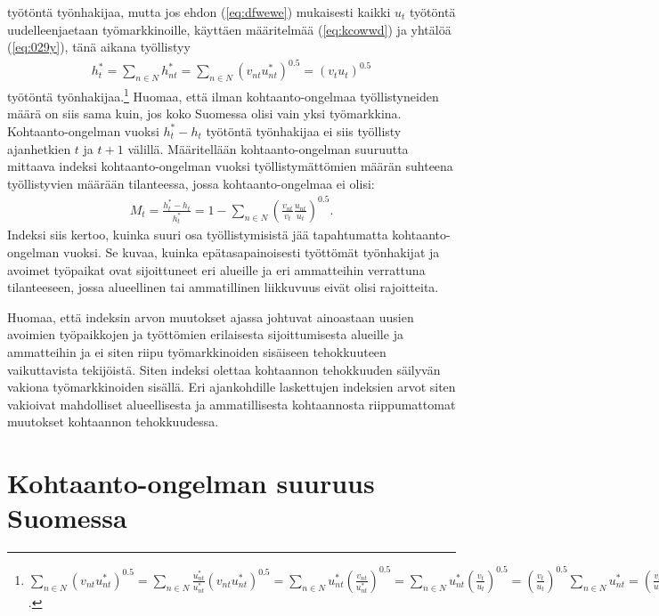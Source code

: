 \documentclass[12pt]{article}
\begin{document}
työtöntä työnhakijaa, mutta jos ehdon (\ref{eq:dfwewe}) mukaisesti kaikki $u_t$ työtöntä uudelleenjaetaan työmarkkinoille, käyttäen määritelmää (\ref{eq:kcowwd}) ja yhtälöä (\ref{eq:029y}), tänä aikana työllistyy
\begin{align}
h_t^*=\sum_{n\in N} h_{nt}^*=\sum_{n\in N}\left(v_{nt}u_{nt}^*\right)^{0.5}=\left(v_tu_t\right)^{0.5}
\end{align}
työtöntä työnhakijaa.\footnote{$\sum_{n\in N}\left(v_{nt}u_{nt}^*\right)^{0.5} = \sum_{n\in N} \frac{u_{nt}^*}{u_{nt}^*} \left(v_{nt}u_{nt}^*\right)^{0.5} = \sum_{n\in N} u_{nt}^* \left( \frac{v_{nt}}{u_{nt}^*}\right)^{0.5}= \sum_{n\in N} u_{nt}^* \left( \frac{v_t}{u_t}\right)^{0.5} = \left( \frac{v_t}{u_t}\right)^{0.5} \sum_{n\in N} u_{nt}^* = \left( \frac{v_t}{u_t}\right)^{0.5} u_t = (v_t u_t)^{0.5}$.} Huomaa, että ilman kohtaanto-ongelmaa työllistyneiden määrä on siis sama kuin, jos koko Suomessa olisi vain yksi työmarkkina. Kohtaanto-ongelman vuoksi $h_t^*-h_t$ työtöntä työnhakijaa ei siis työllisty ajanhetkien $t$ ja $t+1$ välillä. Määritellään kohtaanto-ongelman suuruutta mittaava indeksi kohtaanto-ongelman vuoksi työllistymättömien määrän suhteena työllistyvien määrään tilanteessa, jossa kohtaanto-ongelmaa ei olisi:
\begin{align}
M_t=\frac{h_t^*-h_t}{h_t^*}=1-\sum_{n\in N}\left(\frac{v_{nt}}{v_t}\frac{u_{nt}}{u_t}\right)^{0.5}.
\end{align}
Indeksi siis kertoo, kuinka suuri osa työllistymisistä jää tapahtumatta kohtaanto-ongelman vuoksi. Se kuvaa, kuinka epätasapainoisesti työttömät työnhakijat ja avoimet työpaikat ovat sijoittuneet eri alueille ja eri ammatteihin verrattuna tilanteeseen, jossa alueellinen tai ammatillinen liikkuvuus eivät olisi rajoitteita. 

Huomaa, että indeksin arvon muutokset ajassa johtuvat ainoastaan uusien avoimien työpaikkojen ja työttömien erilaisesta sijoittumisesta alueille ja ammatteihin ja ei siten riipu työmarkkinoiden sisäiseen tehokkuuteen vaikuttavista tekijöistä. Siten indeksi olettaa kohtaannon tehokkuuden säilyvän vakiona työmarkkinoiden sisällä. Eri ajankohdille laskettujen indeksien arvot siten vakioivat mahdolliset alueellisesta ja ammatillisesta kohtaannosta riippumattomat muutokset kohtaannon tehokkuudessa.

\section{Kohtaanto-ongelman suuruus Suomessa} \label{section:kohtaanto-ongelman suuruus suomessa}
\end{document}
